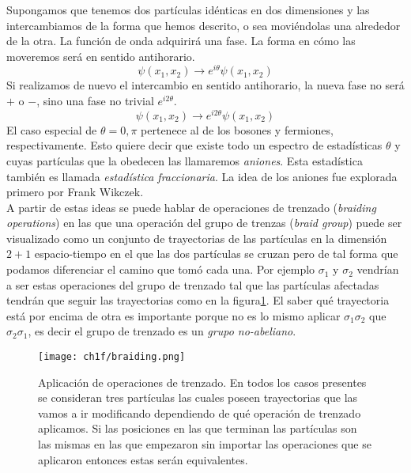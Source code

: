 Supongamos que tenemos dos part\'{i}culas id\'{e}nticas en dos dimensiones y las intercambiamos de la forma que hemos descrito, o sea movi\'{e}ndolas una alrededor de la otra. La funci\'{o}n de onda adquirir\'{a} una fase. La forma en c\'{o}mo las moveremos ser\'{a} en sentido antihorario. 
\begin{equation}
    \psi(x_1,x_2)\rightarrow e^{i\theta}\psi(x_1,x_2)
\end{equation}
Si realizamos de nuevo el intercambio en sentido antihorario, la nueva fase no ser\'{a} $+$ o $-$, sino una fase no trivial $e^{i2\theta}$.
\begin{equation}
    \psi(x_1,x_2)\rightarrow e^{i2\theta}\psi(x_1,x_2)
\end{equation}
El caso especial de $\theta=0,\pi$ pertenece al de los bosones y fermiones, respectivamente. Esto quiere decir que existe todo un espectro de estad\'{i}sticas $\theta$ y cuyas part\'{i}culas que la obedecen las llamaremos \emph{aniones}. Esta estad\'{i}stica tambi\'{e}n es llamada \emph{estad\'{i}stica fraccionaria}. La idea de los aniones fue explorada primero por Frank Wikczek\cite{PhysRevLett49957}\cite{RevModPhys801083}.\\
A partir de estas ideas se puede hablar de operaciones de trenzado (\emph{braiding operations}) en las que una operaci\'{o}n del grupo de trenzas (\emph{braid group}) puede ser visualizado como un conjunto de trayectorias de las part\'{i}culas en la dimensi\'{o}n $2+1$ espacio-tiempo en el que las dos part\'{i}culas se cruzan pero de tal forma que podamos diferenciar el camino que tom\'{o} cada una.
Por ejemplo $\sigma_1$ y $\sigma_2$ vendr\'{i}an a ser estas operaciones del grupo de trenzado tal que las part\'{i}culas afectadas tendr\'{a}n que seguir las trayectorias como en la figura\ref{fig:braiding}. El saber qu\'{e} trayectoria est\'{a} por encima de otra es importante porque no es lo mismo aplicar $\sigma_1\sigma_2$ que $\sigma_2\sigma_1$, es decir el grupo de trenzado es un \emph{grupo no-abeliano}. 
%
%
\begin{figure}[H]
    \centering
    \texttt{[image: ch1f/braiding.png]}
    \caption{Aplicaci\'{o}n de operaciones de trenzado. En todos los casos presentes se consideran tres part\'{i}culas las cuales poseen trayectorias que las vamos a ir modificando dependiendo de qu\'{e} operaci\'{o}n de trenzado aplicamos. Si las posiciones en las que terminan las part\'{i}culas son las mismas en las que empezaron sin importar las operaciones que se aplicaron entonces estas ser\'{a}n equivalentes.}
    \label{fig:braiding}
\end{figure}
